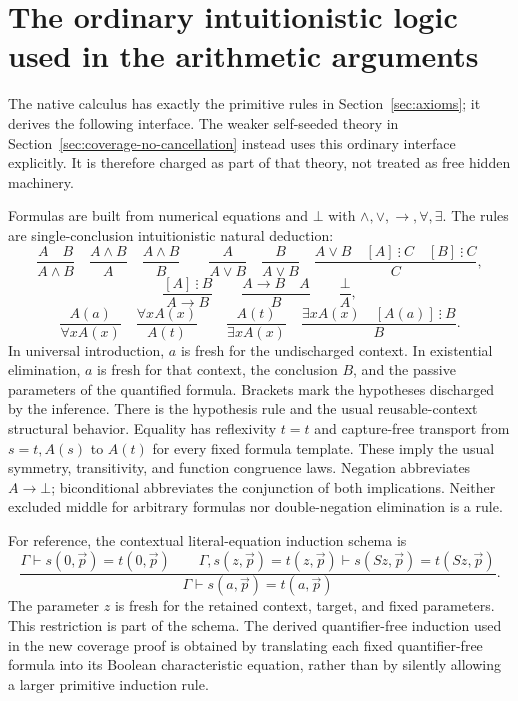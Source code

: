 \section{The ordinary intuitionistic logic used in the arithmetic arguments}
\label{sec:ordinary-rules}
The native calculus has exactly the primitive rules in
Section~\ref{sec:axioms}; it derives the following interface. The weaker
self-seeded theory in Section~\ref{sec:coverage-no-cancellation} instead
uses this ordinary interface explicitly. It is therefore charged as part
of that theory, not treated as free hidden machinery.

Formulas are built from numerical equations and $\bot$ with
$\wedge,\vee,\to,\forall,\exists$. The rules are single-conclusion
intuitionistic natural deduction:
\[
\frac{A\quad B}{A\wedge B}\quad
\frac{A\wedge B}{A}\quad\frac{A\wedge B}{B}\qquad
\frac{A}{A\vee B}\quad\frac{B}{A\vee B}\quad
\frac{A\vee B\quad[A]\ \vdots\ C\quad[B]\ \vdots\ C}{C},
\]
\[
\frac{[A]\ \vdots\ B}{A\to B}\qquad
\frac{A\to B\quad A}{B}\qquad
\frac{\bot}{A},
\]
\[
\frac{A(a)}{\forall xA(x)}\quad
\frac{\forall xA(x)}{A(t)}\qquad
\frac{A(t)}{\exists xA(x)}\quad
\frac{\exists xA(x)\quad[A(a)]\ \vdots\ B}{B}.
\]
In universal introduction, $a$ is fresh for the undischarged context.
In existential elimination, $a$ is fresh for that context, the conclusion
$B$, and the passive parameters of the quantified formula. Brackets
mark the hypotheses discharged by the inference. There is the hypothesis
rule and the usual reusable-context structural behavior. Equality has
reflexivity $t=t$ and capture-free transport from $s=t,A(s)$ to $A(t)$
for every fixed formula template. These imply the usual symmetry,
transitivity, and function congruence laws. Negation abbreviates
$A\to\bot$; biconditional abbreviates the conjunction of both implications.
Neither excluded middle for arbitrary formulas nor double-negation
elimination is a rule.

For reference, the contextual literal-equation induction schema is
\[
\frac{\Gamma\vdash s(0,\vec p)=t(0,\vec p)\qquad
 \Gamma,s(z,\vec p)=t(z,\vec p)\vdash s(Sz,\vec p)=t(Sz,\vec p)}
 {\Gamma\vdash s(a,\vec p)=t(a,\vec p)}.
\]
The parameter $z$ is fresh for the retained context, target, and fixed
parameters. This restriction is part of the schema. The derived
quantifier-free induction used in the new coverage proof is obtained
by translating each fixed quantifier-free formula into its Boolean
characteristic equation, rather than by silently allowing a larger
primitive induction rule.
